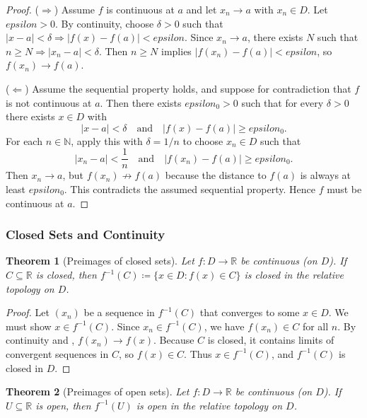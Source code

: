 \documentclass[12pt]{article}
\numberwithin{equation}{section}
\def\abs#1{|#1|}
\def\eps{epsilon}
\newcommand{\RR}{\mathbb{R}}
\newcommand{\NN}{\mathbb{N}}
\DeclarePairedDelimiter{\abs}{\lvert}{\rvert}
\newcommand{\eps}{\varepsilon}               %
\theoremstyle{plain}
\newtheorem{theorem}{Theorem}[section]
\theoremstyle{definition}
\theoremstyle{remark}
\begin{document}
\begin{proof}
($\Rightarrow$) Assume $f$ is continuous at $a$ and let $x_n\to a$ with $x_n\in D$.
Let $\eps>0$. By continuity, choose $\delta>0$ such that $\abs{x-a}<\delta\Rightarrow \abs{f(x)-f(a)}<\eps$.
Since $x_n\to a$, there exists $N$ such that $n\ge N\Rightarrow \abs{x_n-a}<\delta$.
Then $n\ge N$ implies $\abs{f(x_n)-f(a)}<\eps$, so $f(x_n)\to f(a)$.

($\Leftarrow$) Assume the sequential property holds, and suppose for contradiction that $f$ is not continuous at $a$.
Then there exists $\eps_0>0$ such that for every $\delta>0$ there exists $x\in D$ with
\[
\abs{x-a}<\delta
\quad\text{and}\quad
\abs{f(x)-f(a)}\ge \eps_0.
\]
For each $n\in\NN$, apply this with $\delta=1/n$ to choose $x_n\in D$ such that
\[
\abs{x_n-a}<\frac{1}{n}
\quad\text{and}\quad
\abs{f(x_n)-f(a)}\ge \eps_0.
\]
Then $x_n\to a$, but $f(x_n)\not\to f(a)$ because the distance to $f(a)$ is always at least $\eps_0$.
This contradicts the assumed sequential property.
Hence $f$ must be continuous at $a$.
\end{proof}

\subsubsection{Closed Sets and Continuity}

\begin{theorem}[Preimages of closed sets]\label{thm:preimage-closed}
Let $f:D\to\RR$ be continuous (on $D$).
If $C\subseteq\RR$ is closed, then $f^{-1}(C)\coloneqq \{x\in D: f(x)\in C\}$ is closed in the relative topology on $D$.
\end{theorem}

\begin{proof}
Let $(x_n)$ be a sequence in $f^{-1}(C)$ that converges to some $x\in D$.
We must show $x\in f^{-1}(C)$.
Since $x_n\in f^{-1}(C)$, we have $f(x_n)\in C$ for all $n$.
By continuity and , $f(x_n)\to f(x)$.
Because $C$ is closed, it contains limits of convergent sequences in $C$, so $f(x)\in C$.
Thus $x\in f^{-1}(C)$, and $f^{-1}(C)$ is closed in $D$.
\end{proof}

\begin{theorem}[Preimages of open sets]\label{thm:preimage-open}
Let $f:D\to\RR$ be continuous (on $D$).
If $U\subseteq\RR$ is open, then $f^{-1}(U)$ is open in the relative topology on $D$.
\end{theorem}
\end{document}
